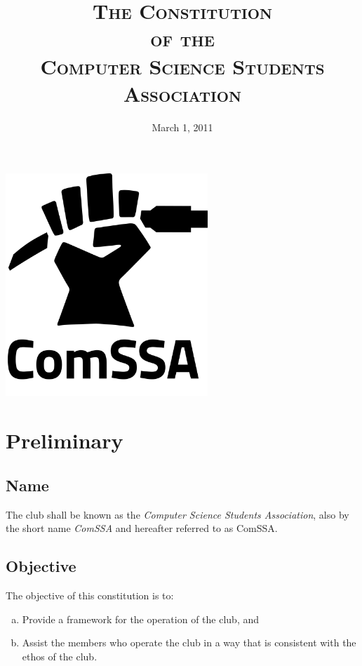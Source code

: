 \documentclass[a4paper,12pt]{article}
\title{\scshape
	The Constitution\\
	of the\\
	Computer Science Students Association
}
\date{March 1, 2011}
\author{} %
\begin{document}
\maketitle

\vspace{1in}

\begin{center}
	\includegraphics[width=3in]{logo/comssalogo_black_large.png}
\end{center}

\newpage


\section{Preliminary}

\subsection{Name}

The club shall be known as the \textit{Computer Science Students Association}, also by the short name \textit{ComSSA} and hereafter referred to as ComSSA.

\subsection{Objective}

The objective of this constitution is to:

\begin{enumerate}[a)]
	\item Provide a framework for the operation of the club, and
	\item Assist the members who operate the club in a way that is consistent with the ethos of the club.
\end{enumerate}
\end{document}
